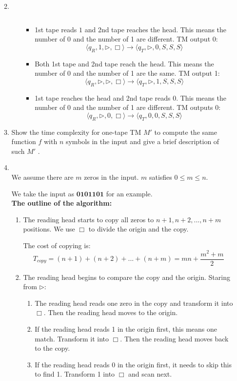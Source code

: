 \documentclass[12pt,a4paper]{article}
\makeatletter
\newtheorem*{solution}{Solution}
\theoremstyle{definition}
\renewenvironment{solution}[1][Solution] {\par\pushQED{\qed}\normalfont\topsep6\p@\@plus6\p@\relax\trivlist\item[\hskip\labelsep\bfseries#1\@addpunct{.}]\ignorespaces}{\popQED\endtrivlist\@endpefalse} \makeatother
\makeatother
\begin{document}
\begin{enumerate}
\begin{enumerate}
\begin{solution}
\begin{enumerate}
\begin{itemize}
$$	        $$
	        \item 1st tape reads $1$ and 2nd tape reaches the head. This means the number of 0 and the number of 1 are different. TM output 0:
	         $$
	        \langle q_R,1,\triangleright,\Box  \rangle \rightarrow \langle q_T,\triangleright,0,S,S,S \rangle
	        $$
	        \item Both 1st tape and 2nd tape reach the head. This means the number of 0 and the number of 1 are the same. TM output 1:
	         $$
	        \langle q_R,\triangleright,\triangleright,\Box  \rangle \rightarrow \langle q_T,\triangleright,1,S,S,S \rangle
	        $$
	        \item 1st tape reaches the head and 2nd tape reads 0. This means the number of 0 and the number of 1 are different. TM outputs 0:
	        $$
	        \langle q_R,\triangleright,0,\Box  \rangle \rightarrow \langle q_T,0,0,S,S,S \rangle
	        $$
	        \end{itemize}
	    \end{enumerate}
	    \end{solution}
	    \item 
	    Show the time complexity for one-tape TM $M'$ to compute the same function $f$ with $n$ symbols in the input and give a brief description of such $M'$ .
	    \begin{solution}
	    ~\\
	    We assume there are $m$ zeros in the input. $m$ satisfies $0\leq m \leq n$.
	    
	    We take the input as $\mathbf{0101101}$ for an example.
	    ~\\
	    \textbf{The outline of the algorithm:} 
	    
	    \begin{enumerate}
	        \item The reading head starts to copy all zeros to $n+1,n+2,...,n+m$ positions. We use $\Box$ to divide the origin and the copy.
	        
	        The cost of copying is:
	        $$
	        T_{copy} = (n+1)+(n+2)+...+(n+m)=mn+\frac{m^2+m}{2}
	        $$
	       
	        \item The reading head begins to compare the copy and the origin. Staring from $\triangleright$:
	        \begin{enumerate}
	            \item The reading head reads one zero in the copy and transform it into $\Box$. Then the reading head moves to the origin. 
	            \item If the reading head reads 1 in the origin first, this means one match. Transform it into $\Box$. Then the reading head moves back to the copy.
	            \item If the reading head reads 0 in the origin first, it needs to skip this to find 1. Transform 1 into $\Box$ and scan next.
              

\end{enumerate}
\end{enumerate}
\end{solution}
\end{enumerate}
\end{enumerate}
\end{document}
